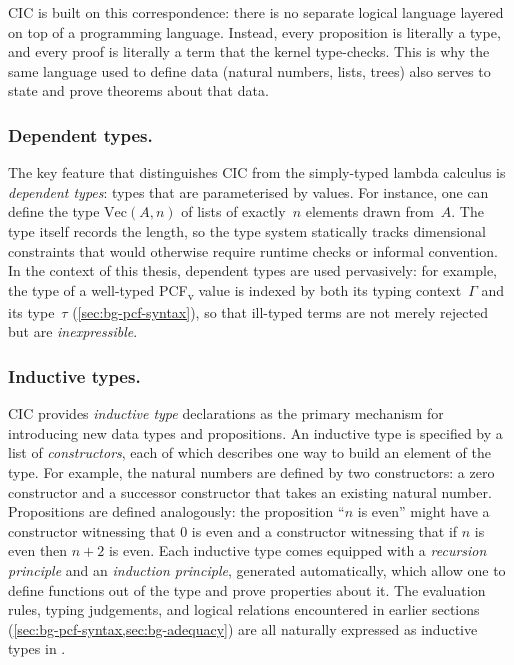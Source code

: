 CIC is built on this correspondence: there is no separate logical
language layered on top of a programming language.  Instead, every
proposition is literally a type, and every proof is literally a
term that the kernel type-checks.  This is why the same language
used to define data (natural numbers, lists, trees) also serves to
state and prove theorems about that data.

\subsubsection*{Dependent types.}

The key feature that distinguishes CIC from the simply-typed lambda
calculus is \emph{dependent types}: types that are parameterised by
values.  For instance, one can define the type $\mathrm{Vec}(A, n)$ of
lists of exactly~$n$ elements drawn from~$A$.  The type itself records
the length, so the type system statically tracks dimensional constraints
that would otherwise require runtime checks or informal convention.  In
the context of this thesis, dependent types are used pervasively: for
example, the type of a well-typed PCF\textsubscript{v} value is indexed
by both its typing context~$\Gamma$ and its type~$\tau$
(\cref{sec:bg-pcf-syntax}), so that ill-typed terms are not merely
rejected but are \emph{inexpressible}.

\subsubsection*{Inductive types.}

CIC provides \emph{inductive type} declarations as the primary mechanism
for introducing new data types and propositions.  An inductive type is
specified by a list of \emph{constructors}, each of which describes one
way to build an element of the type.  For example, the natural numbers
are defined by two constructors: a zero constructor and a successor
constructor that takes an existing natural number.  Propositions are
defined analogously: the proposition ``$n$ is even'' might have a
constructor witnessing that $0$ is even and a constructor witnessing that
if $n$ is even then $n + 2$ is even.  Each inductive type comes equipped
with a \emph{recursion principle} and an \emph{induction principle},
generated automatically, which allow one to define functions out of the
type and prove properties about it.  The evaluation rules, typing
judgements, and logical relations encountered in earlier sections
(\cref{sec:bg-pcf-syntax,sec:bg-adequacy}) are all naturally expressed
as inductive types in \Rocq{}.

